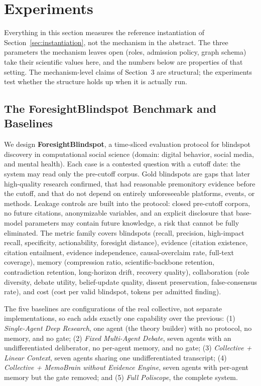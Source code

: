 \section{Experiments}

Everything in this section measures the reference instantiation of
Section~\ref{sec:instantiation}, not the mechanism in the abstract. The three
parameters the mechanism leaves open (roles, admission policy, graph schema)
take their scientific values here, and the numbers below are properties of
that setting. The mechanism-level claims of Section~3 are structural; the
experiments test whether the structure holds up when it is actually run.

\subsection{The ForesightBlindspot Benchmark and Baselines}

We design \textbf{ForesightBlindspot}, a time-sliced evaluation protocol for
blindspot discovery in computational social science (domain: digital
behavior, social media, and mental health). Each case is a contested question
with a cutoff date: the system may read only the pre-cutoff corpus. Gold
blindspots are gaps that later high-quality research confirmed, that had
reasonable premonitory evidence before the cutoff, and that do not depend on
entirely unforeseeable platforms, events, or methods. Leakage controls are
built into the protocol: closed pre-cutoff corpora, no future citations,
anonymizable variables, and an explicit disclosure that base-model parameters
may contain future knowledge, a risk that cannot be fully eliminated. The
metric family covers blindspots (recall, precision, high-impact recall,
specificity, actionability, foresight distance), evidence (citation
existence, citation entailment, evidence independence, causal-overclaim rate,
full-text coverage), memory (compression ratio, scientific-backbone
retention, contradiction retention, long-horizon drift, recovery quality),
collaboration (role diversity, debate utility, belief-update quality, dissent
preservation, false-consensus rate), and cost (cost per valid blindspot,
tokens per admitted finding).

The five baselines are configurations of the real collective, not separate
implementations, so each adds exactly one capability over the
previous: (1) \emph{Single-Agent Deep Research}, one agent (the theory
builder) with no protocol, no memory, and no gate; (2) \emph{Fixed
Multi-Agent Debate}, seven agents with an undifferentiated deliberator, no
per-agent memory, and no gate; (3) \emph{Collective + Linear Context}, seven
agents sharing one undifferentiated transcript; (4) \emph{Collective +
MemoBrain without Evidence Engine}, seven agents with per-agent memory but the
gate removed; and (5) \emph{Full Poliscope}, the complete system.

